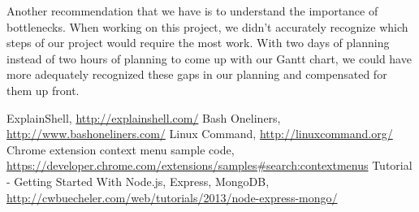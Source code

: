 \documentclass[11pt]{article}
\begin{document}
Another recommendation that we have is to understand the importance of
bottlenecks. When working on this project, we didn't accurately recognize which
steps of our project would require the most work. With two days of planning
instead of two hours of planning to come up with our Gantt chart, we could have
more adequately recognized these gaps in our planning and compensated for them
up front.

\newpage

\begin{thebibliography}{9}
      ExplainShell, \url{http://explainshell.com/}
    Bash Oneliners, \url{http://www.bashoneliners.com/}
    Linux Command, \url{http://linuxcommand.org/}
    Chrome extension context menu sample code,
    \url{https://developer.chrome.com/extensions/samples#search:contextmenus}
    Tutorial - Getting Started With Node.js, Express, MongoDB,
    \url{http://cwbuecheler.com/web/tutorials/2013/node-express-mongo/}
\end{thebibliography}
\end{document}
